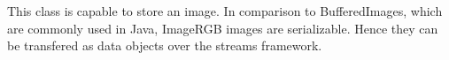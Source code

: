 This class is capable to store an image. In comparison to BufferedImages, which are commonly used in Java, ImageRGB images are serializable. Hence they can be transfered as data objects over the streams framework.